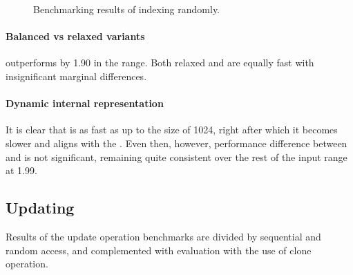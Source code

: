 \begin{figure}[t]

    \caption{Benchmarking results of indexing randomly.}
    \label{fig:index-randomly}
\end{figure}

\paragraph{Balanced vs relaxed variants}
\rbvec{} outperforms \rrbvec{} by 1.90 in the \range{[100, \mega{1}]} range. Both relaxed \rrbvec{} and \imrsvec{} are equally fast with insignificant marginal differences.

\paragraph{Dynamic internal representation}
It is clear that \pvec{} is as fast as \stdvec{} up to the size of 1024, right after which it becomes slower and aligns with the \rrbvec{}. Even then, however, performance difference between \stdvec{} and \pvec{} is not significant, remaining quite consistent over the rest of the input range at 1.99. 

\subsection{Updating}
Results of the update operation benchmarks are divided by sequential and random access, and complemented with evaluation with the use of clone operation. 

